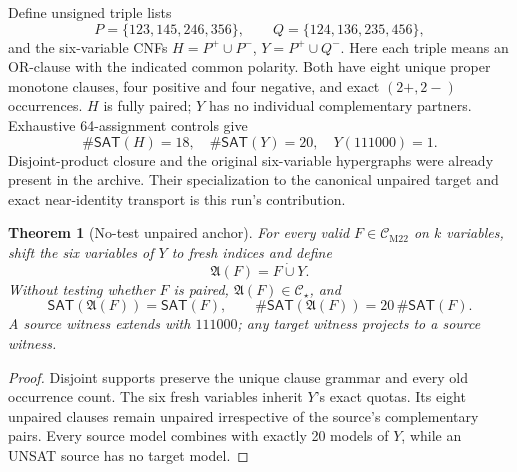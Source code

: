\documentclass[11pt]{article}
\newtheorem{theorem}{Theorem}
\newcommand{\CM}{\mathcal C_{\mathrm{M22}}}
\newcommand{\CS}{\mathcal C_{\star}}
\newcommand{\SAT}{\mathsf{SAT}}
\begin{document}
Define unsigned triple lists
\[
P=\{123,145,246,356\},\qquad Q=\{124,136,235,456\},
\]
and the six-variable CNFs \(H=P^+\cup P^-\), \(Y=P^+\cup Q^-\). Here each triple means an OR-clause with the indicated common polarity. Both have eight unique proper monotone clauses, four positive and four negative, and exact \((2+,2-)\) occurrences. \(H\) is fully paired; \(Y\) has no individual complementary partners. Exhaustive 64-assignment controls give
\[
\#\SAT(H)=18,\quad\#\SAT(Y)=20,\quad Y(111000)=1.
\]
Disjoint-product closure and the original six-variable hypergraphs were already present in the archive. Their specialization to the canonical unpaired target and exact near-identity transport is this run's contribution.

\begin{theorem}[No-test unpaired anchor]\label{th:anchor}
For every valid \(F\in\CM\) on \(k\) variables, shift the six variables of \(Y\) to fresh indices and define
\[
\mathfrak A(F)=F\dot\cup Y.
\]
Without testing whether \(F\) is paired, \(\mathfrak A(F)\in\CS\), and
\[
\SAT(\mathfrak A(F))=\SAT(F),\qquad
\#\SAT(\mathfrak A(F))=20\,\#\SAT(F).
\]
A source witness extends with \(111000\); any target witness projects to a source witness.
\end{theorem}
\begin{proof}
Disjoint supports preserve the unique clause grammar and every old occurrence count. The six fresh variables inherit \(Y\)'s exact quotas. Its eight unpaired clauses remain unpaired irrespective of the source's complementary pairs. Every source model combines with exactly 20 models of \(Y\), while an UNSAT source has no target model.
\end{proof}
\end{document}
